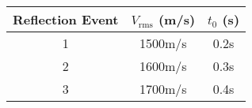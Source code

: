 \begin{center}
\begin{tabular}{|c|c|c|}
\hline
\textbf{Reflection Event} & \textbf{$V_{\text{rms}}$ (m/s)} & \textbf{$t_0$ (s)} \\
\hline
1 & 1500m/s & 0.2s \\
\hline
2 & 1600m/s & 0.3s \\
\hline
3 & 1700m/s & 0.4s \\
\hline
\end{tabular}
\end{center}